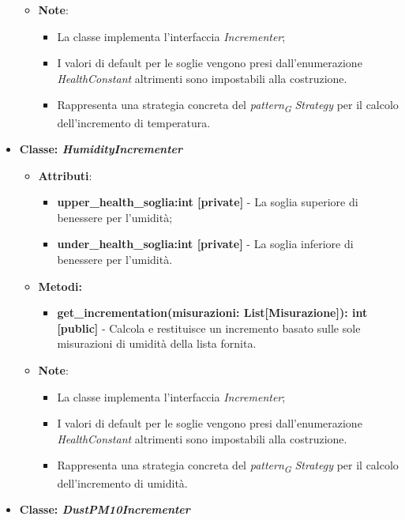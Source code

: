 \begin{itemize}
\begin{itemize}
\begin{itemize}
    \end{itemize}
    \item\textbf{Note}:
        \begin{itemize}
            \item La classe implementa l'interfaccia \textit{Incrementer};
            \item I valori di default per le soglie vengono presi dall'enumerazione \textit{HealthConstant} altrimenti sono impostabili alla costruzione.
            \item Rappresenta una strategia concreta del \textit{pattern}\textsubscript{\textit{G}} \textit{Strategy} per il calcolo dell'incremento di temperatura.
        \end{itemize}
    \end{itemize}
    \item{\textbf{Classe: \textit{HumidityIncrementer}}}
    \begin{itemize}
    \item\textbf{Attributi}:
        \begin{itemize}
        \item \textbf{upper\_health\_soglia:int [private]} - La soglia superiore di benessere per l'umidità;
        \item \textbf{under\_health\_soglia:int [private]} - La soglia inferiore di benessere per l'umidità.
    \end{itemize}
    \item \textbf{Metodi: }
    \begin{itemize}
        \item \textbf{get\_incrementation(misurazioni: List[Misurazione]): int [public]} - Calcola e restituisce un incremento basato sulle sole misurazioni di umidità della lista fornita.
    \end{itemize}
    \item\textbf{Note}:
        \begin{itemize}
            \item La classe implementa l'interfaccia \textit{Incrementer};
            \item I valori di default per le soglie vengono presi dall'enumerazione \textit{HealthConstant} altrimenti sono impostabili alla costruzione.
            \item Rappresenta una strategia concreta del \textit{pattern}\textsubscript{\textit{G}} \textit{Strategy} per il calcolo dell'incremento di umidità.
        \end{itemize}
    \end{itemize}\item{\textbf{Classe: \textit{DustPM10Incrementer}}}

\end{itemize}
